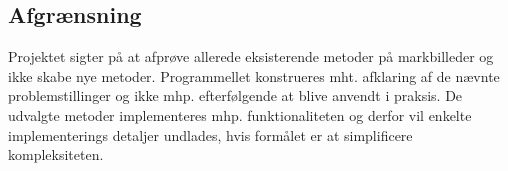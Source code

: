 \subsection{Afgrænsning} \label{subsec:afg}
Projektet sigter på at afprøve allerede eksisterende metoder på markbilleder og ikke
skabe nye metoder. Programmellet konstrueres mht. afklaring af de nævnte problemstillinger
og ikke mhp. efterfølgende at blive anvendt i praksis. De udvalgte metoder implementeres mhp. funktionaliteten og derfor vil enkelte implementerings detaljer undlades, hvis formålet er at simplificere kompleksiteten.